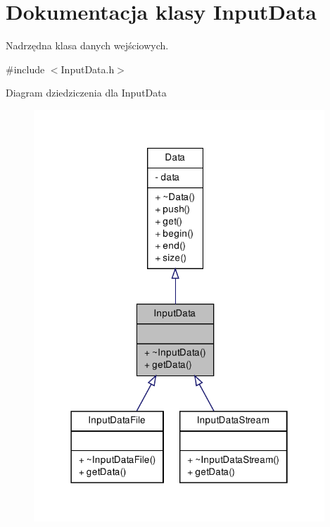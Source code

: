 \hypertarget{class_input_data}{\section{\-Dokumentacja klasy \-Input\-Data}
\label{class_input_data}
}


\-Nadrzędna klasa danych wejściowych.  




{\ttfamily \#include $<$\-Input\-Data.\-h$>$}



\-Diagram dziedziczenia dla \-Input\-Data\nopagebreak
\begin{figure}[H]
\begin{center}
\leavevmode
\includegraphics[width=310pt]{class_input_data__inherit__graph}
\end{center}
\end{figure}


